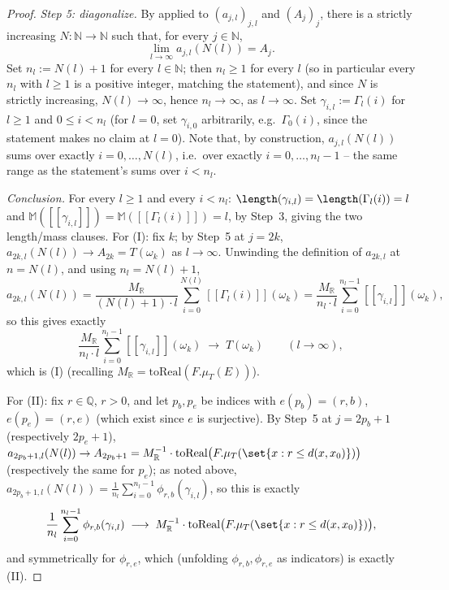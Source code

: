 \begin{proof}
  \emph{Step 5: diagonalize.} By  applied to $(a_{j,l})_{j,l}$
  and $(A_j)_j$, there is a strictly increasing $N\colon\mathbb{N}\to\mathbb{N}$ such that, for
  every $j\in\mathbb{N}$,
  \[
    \lim_{l\to\infty} a_{j,l}(N(l)) = A_j
    .
  \]
  Set $n_l := N(l)+1$ for every $l\in\mathbb{N}$; then $n_l\ge1$ for every $l$ (so in particular
  every $n_l$ with $l\ge1$ is a positive integer, matching the statement), and since $N$ is
  strictly increasing, $N(l)\to\infty$, hence $n_l\to\infty$, as $l\to\infty$. Set
  $\gamma_{i,l} := \Gamma_l(i)$ for $l\ge1$ and $0\le i<n_l$ (for $l=0$, set $\gamma_{i,0}$
  arbitrarily, e.g.\ $\Gamma_0(i)$, since the statement makes no claim at $l=0$). Note that, by
  construction, $a_{j,l}(N(l))$ sums over exactly $i=0,\dots,N(l)$, i.e.\ over exactly
  $i=0,\dots,n_l-1$ -- the same range as the statement's sums over $i<n_l$.

  \emph{Conclusion.} For every $l\ge1$ and every $i<n_l$: $\length(\gamma_{i,l}) =
  \length(\Gamma_l(i)) = l$ and $\mathbb{M}([[\gamma_{i,l}]]) = \mathbb{M}([[\Gamma_l(i)]]) = l$, by
  Step~3, giving the two length/mass clauses. For (I): fix $k$; by Step~5 at $j=2k$,
  $a_{2k,l}(N(l)) \to A_{2k} = T(\omega_k)$ as $l\to\infty$. Unwinding the definition of $a_{2k,l}$
  at $n=N(l)$, and using $n_l = N(l)+1$,
  \[
    a_{2k,l}(N(l)) = \frac{M_{\mathbb R}}{(N(l)+1)\cdot l}\sum_{i=0}^{N(l)}[[\Gamma_l(i)]](\omega_k)
    = \frac{M_{\mathbb R}}{n_l\cdot l}\sum_{i=0}^{n_l-1}[[\gamma_{i,l}]](\omega_k)
    ,
  \]
  so this gives exactly
  \[
    \frac{M_{\mathbb R}}{n_l\cdot l}\sum_{i=0}^{n_l-1}[[\gamma_{i,l}]](\omega_k)
    \;\longrightarrow\; T(\omega_k)
    \qquad(l\to\infty)
    ,
  \]
  which is (I) (recalling $M_{\mathbb R} = \mathrm{toReal}(F.\mu_T(E))$).

  For (II): fix $r\in\mathbb{Q}$, $r>0$, and let $p_b,p_e$ be indices with $e(p_b)=(r,b)$,
  $e(p_e)=(r,e)$ (which exist since $e$ is surjective). By Step~5 at $j=2p_b+1$ (respectively
  $2p_e+1$), $a_{2p_b+1,l}(N(l)) \to A_{2p_b+1} = M_{\mathbb R}^{-1}\cdot
  \mathrm{toReal}\bigl(F.\mu_T(\set{x:r\le d(x,x_0)})\bigr)$ (respectively the same for $p_e$); as
  noted above, $a_{2p_b+1,l}(N(l)) = \tfrac1{n_l}\sum_{i=0}^{n_l-1}\phi_{r,b}(\gamma_{i,l})$, so this
  is exactly
  \[
    \frac1{n_l}\sum_{i=0}^{n_l-1}\phi_{r,b}(\gamma_{i,l})
    \;\longrightarrow\; M_{\mathbb R}^{-1}\cdot\mathrm{toReal}\bigl(F.\mu_T(\set{x:r\le d(x,x_0)})\bigr)
    ,
  \]
  and symmetrically for $\phi_{r,e}$, which (unfolding $\phi_{r,b},\phi_{r,e}$ as indicators) is
  exactly (II).


\end{proof}
